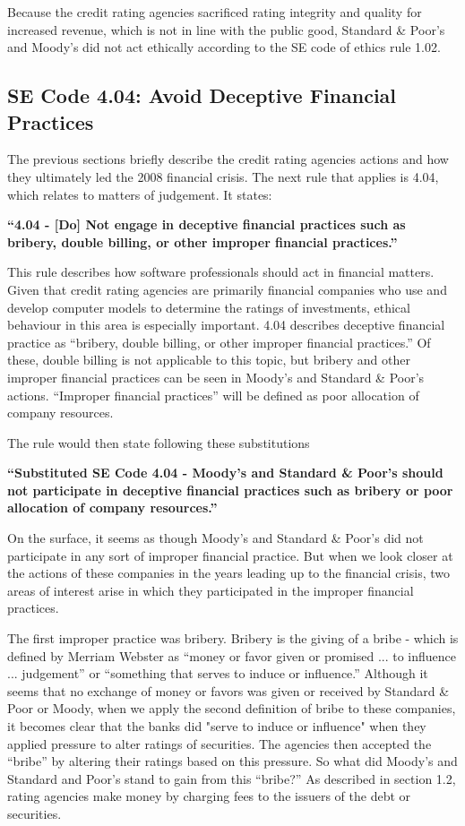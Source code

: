 \documentclass[11pt]{article}
\begin{document}
\begin{multicols}{2}
Because the credit rating agencies sacrificed rating integrity and quality for increased revenue, which is not in line with the public good, Standard \& Poor's and Moody's did not act ethically according to the SE code of ethics rule 1.02.


\subsection{SE Code 4.04: Avoid Deceptive Financial Practices}

The previous sections briefly describe the credit rating agencies actions and how they ultimately led the 2008 financial crisis.  The next rule that applies is 4.04, which relates to matters of judgement.  It states:


   \textbf{``4.04 - [Do] Not engage in deceptive financial practices such as bribery, double billing, or other improper financial practices.''}


This rule describes how software professionals should act in financial matters.  Given that credit rating agencies are primarily financial companies who use and develop computer models to determine the ratings of investments, ethical behaviour in this area is especially important.  
4.04 describes deceptive financial practice as ``bribery, double billing, or other improper financial practices.''  Of these, double billing is not applicable to this topic, but bribery and other improper financial practices can be seen in Moody's and Standard \& Poor's actions.  ``Improper financial practices'' will be defined as poor allocation of company resources. 

The rule would then state following these substitutions


   \textbf{``Substituted SE Code 4.04 - Moody's and Standard \& Poor's should not participate in deceptive financial practices such as bribery or poor allocation of company resources.''}


On the surface, it seems as though Moody's and Standard \& Poor's did not participate in any sort of improper financial practice.  But when we look closer at the actions of these companies in the years leading up to the financial crisis, two areas of interest arise in which they participated in the improper financial practices.  

The first improper practice was bribery.  Bribery is the giving of a bribe - which is defined by Merriam Webster as ``money or favor given or promised ... to influence ... judgement'' or ``something that serves to induce or influence.'' \cite{bribeDef}  Although it seems that no exchange of money or favors was given or received by Standard \& Poor or Moody, when we apply the second definition of bribe to these companies, it becomes clear that the banks did "serve to induce or influence" when they applied pressure to alter ratings of securities.  The agencies then accepted the ``bribe'' by altering their ratings based on this pressure.
So what did Moody's and Standard and Poor's stand to gain from this ``bribe?''  As described in section 1.2, rating agencies make money by charging fees to the issuers of the debt or securities.  



\end{multicols}
\end{document}
